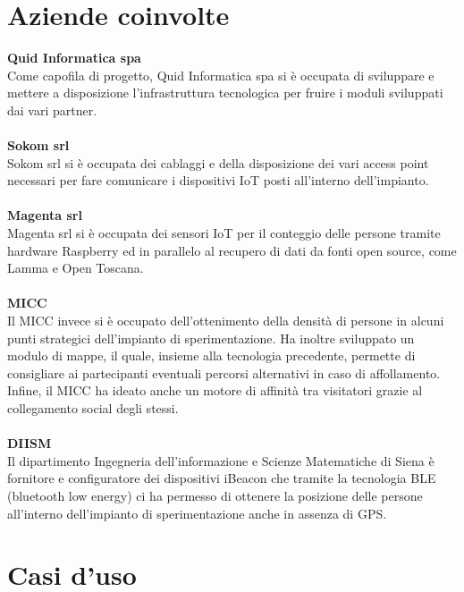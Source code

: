 \paragraph{}

\section{Aziende coinvolte}

\textbf{Quid Informatica spa}\\
Come capofila di progetto, Quid Informatica spa si è occupata di sviluppare e mettere a disposizione l’infrastruttura tecnologica per fruire i moduli sviluppati dai vari partner.
\\\\
\textbf{Sokom srl}\\
Sokom srl si è occupata dei cablaggi e della disposizione dei vari access point necessari per fare comunicare i dispositivi IoT posti all’interno dell’impianto.
\\\\
\textbf{Magenta srl}\\
Magenta srl si è occupata dei sensori IoT per il conteggio delle persone tramite hardware Raspberry ed in parallelo al recupero di dati da fonti open source, come Lamma e Open Toscana.
\\\\
\textbf{MICC}\\
Il MICC invece si è occupato dell’ottenimento della densità di persone in alcuni punti strategici dell’impianto di sperimentazione. Ha inoltre sviluppato un modulo di mappe, il quale, insieme alla tecnologia precedente, permette di consigliare ai partecipanti eventuali percorsi alternativi in caso di affollamento.
Infine, il MICC ha ideato anche un motore di affinità tra visitatori grazie al collegamento social degli stessi.
\\\\
\textbf{DIISM}\\
Il dipartimento Ingegneria dell’informazione e Scienze Matematiche di Siena è fornitore e configuratore dei dispositivi iBeacon che tramite la tecnologia BLE (bluetooth low energy) ci ha permesso di ottenere la posizione delle persone all’interno dell’impianto di sperimentazione anche in assenza di GPS.
\paragraph{}

\section{Casi d'uso}

